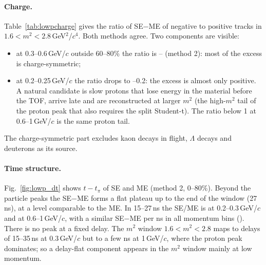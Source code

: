 \paragraph{Charge.} Table~\ref{tab:lowpcharge} gives the ratio of SE$-$ME of negative to positive tracks in
$1.6<m^2<2.8$\,GeV$^2$/$c^4$. Both methods agree. Two components are visible:
\begin{itemize}
\item at 0.3--0.6\,GeV/$c$ outside 60--80\% the ratio is \lowpChMidMin--\lowpChMidMax{} (method 2): most of the excess is
  charge-symmetric;
\item at 0.2--0.25\,GeV/$c$ the ratio drops to \lowpChLowMin--0.2: the excess is almost only positive. A natural candidate is slow
  protons that lose energy in the material before the TOF, arrive late and are reconstructed at larger $m^2$ (the high-$m^2$ tail of the
  proton peak that also requires the split Student-t). The ratio below 1 at 0.6--1\,GeV/$c$ is the same proton tail.
\end{itemize}
The charge-symmetric part excludes kaon decays in flight, $\Lambda$ decays and deuterons as its source.

\paragraph{Time structure.} Fig.~\ref{fig:lowp_dt} shows $t-t_\pi$ of SE and ME (method 2, 0--80\%). Beyond the particle peaks the SE$-$ME
forms a flat plateau up to the end of the window (27\,ns), at a level comparable to the ME. In 15--27\,ns the SE/ME is \lowpLateRatA{}
at 0.2--0.3\,GeV/$c$ and \lowpLateRatD{} at 0.6--1\,GeV/$c$, with a similar SE$-$ME per ns in all momentum bins
(). There is no peak at a fixed delay. The $m^2$ window $1.6<m^2<2.8$ maps to delays of 15--35\,ns at
0.3\,GeV/$c$ but to a few ns at 1\,GeV/$c$, where the proton peak dominates; so a delay-flat component appears in the $m^2$ window
mainly at low momentum.




